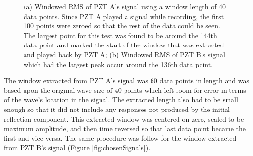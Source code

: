 \begin{figure}
\begin{subfigmatrix}{2}
\end{subfigmatrix}

  \caption
  { \label{fig:windowedRMS}
(a) Windowed RMS of PZT A's signal using a window length of 40 data points. Since PZT A played a signal while recording, the first 100 points were zeroed so that the rest of the data could be seen. The largest point for this test was found to be around the 144th data point and marked the start of the window that was extracted and played back by PZT A;
(b) Windowed RMS of PZT B's signal which had the largest peak occur around the 136th data point.
}
\end{figure}

The window extracted from PZT A's signal was 60 data points in length and was based upon the original wave size of 40 points which left room for error in terms of the wave's location in the signal. The extracted length also had to be small enough so that it did not include any responses not produced by the initial reflection component. This extracted window was centered on zero, scaled to be maximum amplitude, and then time reversed so that last data point became the first and vice-versa. The same procedure was follow for the window extracted from PZT B's signal (Figure \ref{fig:chosenSignals}).

